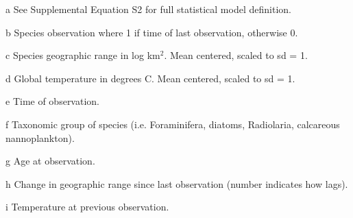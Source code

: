 \documentclass[12pt,letterpaper]{article}
\begin{document}
\begin{table}[ht]
\begin{threeparttable}
{\begin{tabular}{ l p{3cm} l l }
    \hline
   \end{tabular}
  }
  \begin{tablenotes}
  \item[a] See Supplemental Equation S2 for full statistical model definition.
  \item[b] Species observation where 1 if time of last observation, otherwise 0.
  \item[c] Species geographic range in log km\(^2\). Mean centered, scaled to sd = 1.
  \item[d] Global temperature in degrees C. Mean centered, scaled to sd = 1.
  \item[e] Time of observation.
  \item[f] Taxonomic group of species (i.e. Foraminifera, diatoms, Radiolaria, calcareous nannoplankton).
  \item[g] Age at observation.
  \item[h] Change in geographic range since last observation (number indicates how lags).
  \item[i] Temperature at previous observation.
  \end{tablenotes}
 \end{threeparttable}
 \label{tab:model_def}
\end{table}
\end{document}
